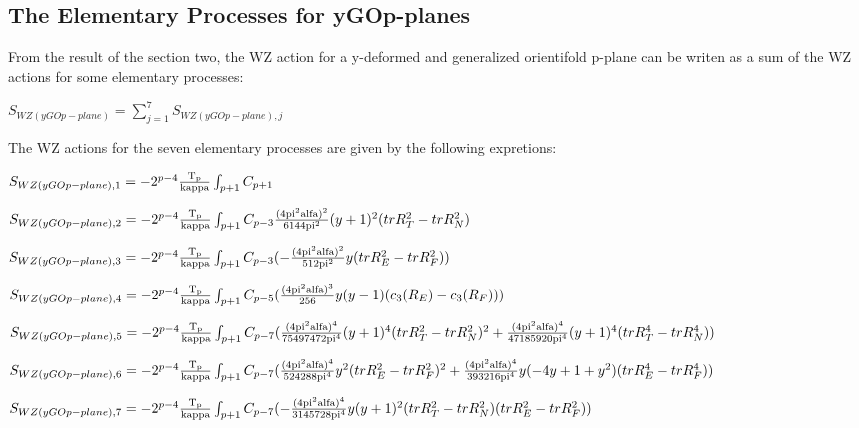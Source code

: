 \documentclass[a4paper,a4paper]{article}
\begin{document}
\subsection{The Elementary Processes for yGOp-planes }
From the result of the section two, the WZ action for a y-deformed and generalized orientifold p-plane can be writen as a sum of the WZ actions for some elementary processes:
\begin{center}
{  $ S_{WZ(yGOp-plane)} = \sum_{j=1}^{7}S_{WZ(yGOp-plane),j} $ }
\end{center}

The WZ actions for the seven elementary processes are given by the following 
expretions:
\begin{center}
{  $ S_{WZ(yGOp-plane),1} = -2^{p-4}\frac{\rm T_p}{\rm kappa}\int_{p+1} C_{p+1}$ }
\end{center} 
\begin{center}
{  $ S_{WZ(yGOp-plane),2} = -2^{p-4}\frac{\rm T_p}{\rm kappa}\int_{p+1} C_{p-3}{\frac{\rm (4pi^2alfa)^2}{\rm 6144pi^2}}{(y+1)^2(trR_T^2- trR_N^2)}$ }
\end{center}
\begin{center}
{  $ S_{WZ(yGOp-plane),3} = -2^{p-4}\frac{\rm T_p}{\rm kappa}\int_{p+1} C_{p-3}(-  \frac{\rm (4pi^2alfa)^2}{\rm 512pi^2}{y(trR_E^2- trR_F^2)})$ }
\end{center}
\begin{center}
{  $ S_{WZ(yGOp-plane),4} = -2^{p-4}\frac{\rm T_p}{\rm kappa}\int_{p+1} C_{p-5}(\frac{\rm (4pi^2alfa)^3}{\rm 256}{{y(y-1)(c_3(R_E)- c_3(R_F))}})$ }
\end{center}
\begin{center}
{  $ S_{WZ(yGOp-plane),5} = -2^{p-4}\frac{\rm T_p}{\rm kappa}\int_{p+1} C_{p-7}(\frac{\rm (4pi^2alfa)^4}{\rm 75497472pi^4}{{(y+1)^4(trR_T^2- trR_N^2)^2}}+\frac{\rm (4pi^2alfa)^4}{\rm 47185920pi^4}{(y+1)^4(trR_T^4- trR_N^4)})$ }
\end{center}
\begin{center}
{  $ S_{WZ(yGOp-plane),6} = -2^{p-4}\frac{\rm T_p}{\rm kappa}\int_{p+1} C_{p-7}(\frac{\rm (4pi^2alfa)^4}{\rm 524288pi^4}{{y^2(trR_E^2-trR_F^2)^2}}+\frac{\rm(4pi^2alfa)^4 }{\rm 393216pi^4}{y(-4y+1+y^2)(trR_E^4- trR_F^4)})$ }
\end{center}
\begin{center}
{  $ S_{WZ(yGOp-plane),7} = -2^{p-4}\frac{\rm T_p}{\rm kappa}\int_{p+1} C_{p-7}(-\frac{\rm (4pi^2alfa)^4}{\rm 3145728pi^4}{y(y+1)^2(trR_T^2- trR_N^2)(trR_E^2- trR_F^2)})$ }
\end{center}
\end{document}
